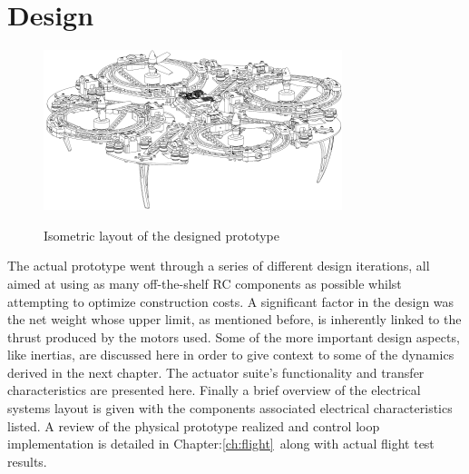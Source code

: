 \section{Design}
\label{sec:proto.design}
\begin{figure}[htbp]
\centering
\includegraphics[width=\textwidth]{figs/iso-design}
\label{fig:iso-design}
\caption{Isometric layout of the designed prototype}
\end{figure}
The actual prototype went through a series of different design iterations, all aimed at using as many off-the-shelf RC components as possible whilst attempting to optimize construction costs. A significant factor in the design was the net weight whose upper limit, as mentioned before, is inherently linked to the thrust produced by the motors used. Some of the more important design aspects, like inertias, are discussed here in order to give context to some of the dynamics derived in the next chapter. The actuator suite's functionality and transfer characteristics are presented here. Finally a brief overview of the electrical systems layout is given with the components associated electrical characteristics listed. A review of the physical prototype realized and control loop implementation is detailed in Chapter:\ref{ch:flight}~along with actual flight test results.
